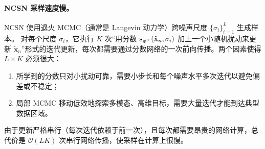\paragraph{NCSN 采样速度慢。}
NCSN 使用退火 MCMC（通常是 Langevin 动力学）跨噪声尺度 $\{\sigma_i\}_{i=1}^L$ 生成样本。
对每个尺度 $\sigma_i$，它执行 $K$ 次``用分数 ${\mathbf{s}}_{\bm{\phi}^\times}(\tilde{\mathbf{x}}_n,\sigma_i)$ 加上一个小随机扰动来更新 $\tilde{\mathbf{x}}_n$''形式的迭代更新，每次都需要通过分数网络的一次前向传播。两个因素使得 $L \times K$ 必须很大：
\begin{enumerate}
    \item[(i)]  所学到的分数只对小扰动可靠，需要小步长和每个噪声水平多次迭代以避免偏差或不稳定；
    \item[(ii)]  局部 MCMC 移动低效地探索多模态、高维目标，需要大量迭代才能到达典型数据区域。
\end{enumerate}
由于更新严格串行（每次迭代依赖于前一次），且每次都需要昂贵的网络计算，总代价是 $\mathcal{O}(L  K)$ 次串行网络传播，使采样在计算上很慢。






